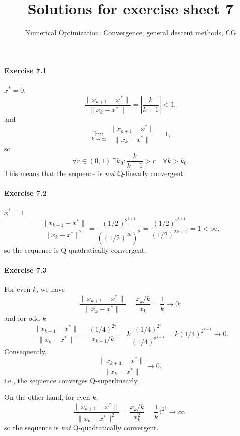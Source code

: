 
\title{Solutions for exercise sheet 7}
\subtitle{Numerical Optimization: Convergence, general descent methods, CG}
\usepackage{algorithm} %
\usepackage{algpseudocode}

\maketitle

\paragraph{Exercise 7.1} %
$x^* = 0$,
\[
\frac{\|x_{k+1}-x^*\|}{\|x_k-x^*\|} = \left|\frac{k}{k+1}\right| < 1,
\]
and
\[
\lim_{k\to\infty} \frac{\|x_{k+1}-x^*\|}{\|x_k-x^*\|} = 1,
\]
so
\[
\forall r\in(0,1)\: \exists k_0: \frac{k}{k+1} > r \quad\forall k>k_0.
\]
This means that the sequence is \emph{not} Q-linearly convergent.


\paragraph{Exercise 7.2} %
$x^* = 1$,
\[
\frac{\|x_{k+1}-x^*\|}{\|x_k-x^*\|^2}
= \frac{(1/2)^{2^{k+1}}}{((1/2)^{2k})^2}
= \frac{(1/2)^{2^{k+1}}}{(1/2)^{2k+1}}
= 1 < \infty,
\]
so the sequence is Q-quadratically convergent.


\paragraph{Exercise 7.3} %
For even $k$, we have
\[
\frac{\|x_{k+1}-x^*\|}{\|x_k-x^*\|}
= \frac{x_k/k}{x_k}
= \frac{1}{k}
\to 0;
\]
and for odd $k$
\[
\frac{\|x_{k+1}-x^*\|}{\|x_k-x^*\|}
= \frac{(1/4)^{2^k}}{x_{k-1}/k}
= k \frac{(1/4)^{2^k}}{(1/4)^{2^{k-1}}}
= k (1/4)^{2^{k-1}}
\to 0.
\]
Consequently,
\[
\frac{\|x_{k+1}-x^*\|}{\|x_k-x^*\|} \to 0,
\]
i.e., the sequence converges Q-superlinearly.

On the other hand, for even $k$,
\[
\frac{\|x_{k+1}-x^*\|}{\|x_k-x^*\|^2}
= \frac{x_k/k}{x_k^2} = \frac{1}{k}4^{2^k} \to \infty,
\]
so the sequence is \emph{not} Q-quadratically convergent.

